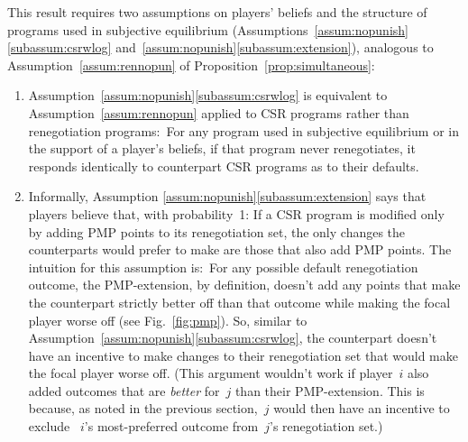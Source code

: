 \documentclass[sigconf]{aamas}
\theoremstyle{definition}
\begin{document}
This result requires two
assumptions
on players' beliefs
and the structure of programs
used in subjective equilibrium
(Assumptions~\ref{assum:nopunish}\ref{subassum:csrwlog} and~\ref{assum:nopunish}\ref{subassum:extension}),
analogous to 
Assumption~\ref{assum:rennopun}
of Proposition~\ref{prop:simultaneous}:
\begin{enumerate}
    \item Assumption~\ref{assum:nopunish}\ref{subassum:csrwlog}
is equivalent to
Assumption~\ref{assum:rennopun}
applied to CSR programs
rather than renegotiation programs:\ For any program
used in subjective equilibrium
or in the support of a player's
beliefs,
if that program never renegotiates,
it responds identically
to counterpart CSR programs
as to their defaults.
\item Informally, Assumption \ref{assum:nopunish}\ref{subassum:extension} 
says that players believe that, with probability~1:
 If a CSR program
is modified only
by adding PMP points
to its renegotiation set,
the only changes the counterparts
would
prefer to make are those that   
also add PMP points.
The intuition for this assumption is:\ For any possible default renegotiation outcome, the PMP-extension, by definition, doesn't add any points that make the counterpart strictly
better off than that outcome while making the focal player worse off (see Fig.~\ref{fig:pmp}).
So, similar
to Assumption~\ref{assum:nopunish}\ref{subassum:csrwlog}, the counterpart doesn't have an incentive
to make changes to their renegotiation set
that would make the focal player worse off.
(This argument wouldn't work if player~$i$ also added
outcomes that are \textit{better} for~$j$
than their PMP-extension. This is because, as noted in the previous section,~$j$ would then have an incentive to
exclude ~$i$'s most-preferred outcome from~$j$'s renegotiation set.)
\end{enumerate}
\end{document}
